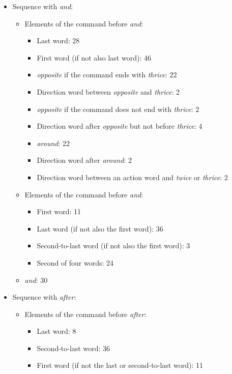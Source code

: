 \begin{itemize}
    \item Sequence with \textit{and}:
    \begin{itemize}
        \item Elements of the command before \textit{and}:
        \begin{itemize}
            \item Last word: 28
            \item First word (if not also last word): 46
            \item \textit{opposite} if the command ends with \textit{thrice}: 22
            \item Direction word between \textit{opposite} and \textit{thrice}: 2
            \item \textit{opposite} if the command does not end with \textit{thrice}: 2
            \item Direction word after \textit{opposite} but not before \textit{thrice}: 4
            \item \textit{around}: 22
            \item Direction word after \textit{around}: 2
            \item Direction word between an action word and \textit{twice} or \textit{thrice}: 2
        \end{itemize}
        \item Elements of the command before \textit{and}:
        \begin{itemize}
            \item First word: 11
            \item Last word (if not also the first word): 36
            \item Second-to-last word (if not also the first word): 3
            \item Second of four words: 24
        \end{itemize}
        \item \textit{and}: 30
    \end{itemize}
    \item Sequence with \textit{after}:
    \begin{itemize}
        \item Elements of the command before \textit{after}:
        \begin{itemize}
            \item Last word: 8
            \item Second-to-last word: 36
            \item First word (if not the last or second-to-last word): 11

\end{itemize}
\end{itemize}
\end{itemize}
